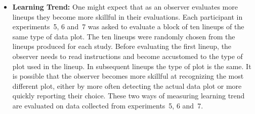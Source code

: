 \documentclass[10pt]{article}\usepackage[]{graphicx}\usepackage[]{color}
\begin{document}
\begin{itemize}



\item{\bf Learning Trend:} One might expect that as an observer evaluates more lineups they  become more skillful in their evaluations. Each participant in  experiments~5, 6 and~7 was asked to evaluate a block of  ten lineups of the same type of data plot. The ten lineups were randomly chosen from the lineups  produced for each study. Before evaluating the first lineup, the observer needs to read instructions and become accustomed to the type of plot used in the lineup. In subsequent lineups  the type of plot is the same. It is possible that the observer becomes more skillful at recognizing the most different plot, either by more often detecting the actual data plot or more quickly reporting their choice. These two ways of measuring learning trend are evaluated on data collected from experiments~5, 6 and~7.




\end{itemize}
\end{document}
